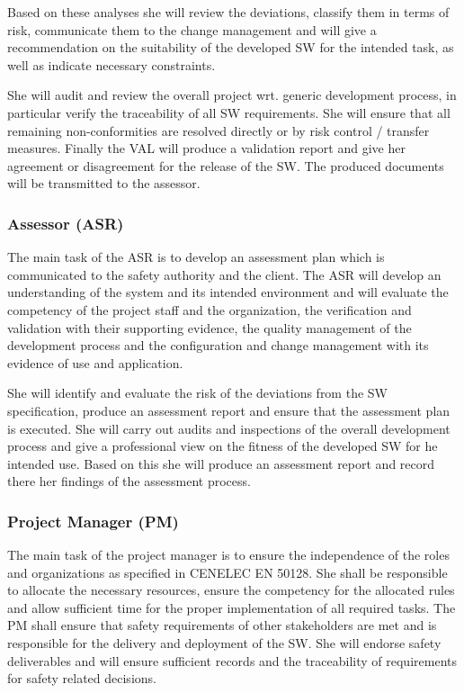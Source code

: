 Based on these analyses she will review the deviations, classify them in terms
of risk, communicate them to the change management and will give a
recommendation on the suitability of the developed SW for the intended task, as
well as indicate necessary constraints.

She will audit and review the overall project wrt. generic development process,
in particular verify the traceability of all SW requirements. She will ensure
that all remaining non-conformities are resolved directly or by risk control /
transfer measures. Finally the VAL will produce a validation report and give her
agreement or disagreement for the release of the SW. The produced documents will
be transmitted to the assessor.

\subsubsection{Assessor (ASR)}
\label{sec:assessor}

The main task of the ASR is to develop an assessment plan which is communicated
to the safety authority and the client. The ASR will develop an understanding of
the system and its intended environment and will evaluate the competency of the
project staff and the organization, the verification and validation with their
supporting evidence, the quality management of the development process and the
configuration and change management with its evidence of use and application.

She will identify and evaluate the risk of the deviations from the SW
specification, produce an assessment report and ensure that the assessment plan
is executed. She will carry out audits and inspections of the overall
development process and give a professional view on the fitness of the developed
SW for he intended use. Based on this she will produce an assessment report and
record there her findings of the assessment process.

\subsubsection{Project Manager (PM)}
\label{sec:project-manager}

The main task of the project manager is to ensure the independence of the roles
and organizations as specified in CENELEC EN 50128. She shall be responsible to
allocate the necessary resources, ensure the competency for the allocated rules
and allow sufficient time for the proper implementation of all required
tasks. The PM shall ensure that safety requirements of other stakeholders are
met and is responsible for the delivery and deployment of the SW. She will
endorse safety deliverables and will ensure sufficient records and the
traceability of requirements for safety related decisions.


